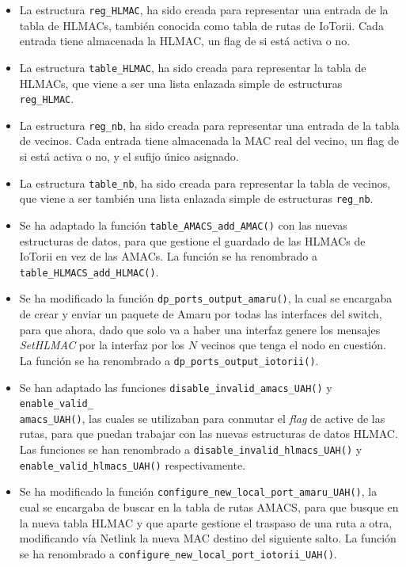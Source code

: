 \begin{itemize}
    \item La estructura \texttt{reg\_HLMAC}, ha sido creada para representar una entrada de la tabla de HLMACs, también conocida como tabla de rutas de IoTorii. Cada entrada tiene almacenada la HLMAC, un flag de si está activa o no.
    \item La estructura \texttt{table\_HLMAC}, ha sido creada para representar la tabla de HLMACs, que viene a ser una lista enlazada simple de estructuras \texttt{reg\_HLMAC}.
    \item La estructura \texttt{reg\_nb}, ha sido creada para representar una entrada de la tabla de vecinos. Cada entrada tiene almacenada la MAC real del vecino, un flag de si está activa o no, y el sufijo único asignado.
    \item La estructura \texttt{table\_nb}, ha sido creada para representar la tabla de vecinos, que viene a ser también una lista enlazada simple de estructuras \texttt{reg\_nb}.
    \item Se ha adaptado la función \texttt{table\_AMACS\_add\_AMAC()} con las nuevas estructuras de datos, para que gestione el guardado de las HLMACs de IoTorii en vez de las AMACs. La función se ha renombrado a \texttt{table\_HLMACS\_add\_HLMAC()}.
    \item Se ha modificado la función \texttt{dp\_ports\_output\_amaru()}, la cual se encargaba de crear y enviar un paquete de Amaru por todas las interfaces del switch, para que ahora, dado que solo va a haber una interfaz genere los mensajes \textit{SetHLMAC} por la interfaz por los $N$ vecinos que tenga el nodo en cuestión. La función se ha renombrado a \texttt{dp\_ports\_output\_iotorii()}.
    \item Se han adaptado las funciones \texttt{disable\_invalid\_amacs\_UAH()} y \texttt{enable\_valid\_\\amacs\_UAH()}, las cuales se utilizaban para conmutar el \textit{flag} de active de las rutas, para que puedan trabajar con las nuevas estructuras de datos HLMAC. Las funciones se han renombrado a \texttt{disable\_invalid\_hlmacs\_UAH()} y \texttt{enable\_valid\_hlmacs\_UAH()} respectivamente.
    \item Se ha modificado la función \texttt{configure\_new\_local\_port\_amaru\_UAH()}, la cual se encargaba de buscar en la tabla de rutas AMACS, para que busque en la nueva tabla HLMAC y que aparte gestione el traspaso de una ruta a otra, modificando vía Netlink la nueva MAC destino del siguiente salto. La función se ha renombrado a \texttt{configure\_new\_local\_port\_iotorii\_UAH()}.

\end{itemize}
